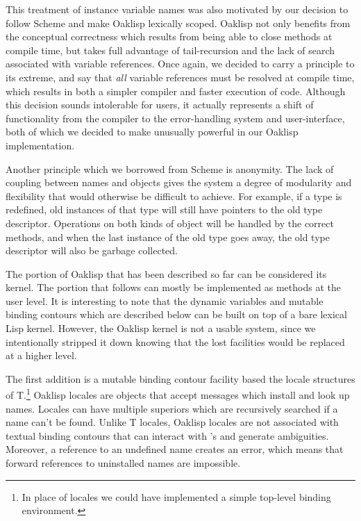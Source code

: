 This treatment of instance variable names was also motivated by our
decision to follow Scheme and make Oaklisp lexically scoped.  Oaklisp
not only benefits from the conceptual correctness which results from
being able to close methods at compile time, but takes full advantage
of tail-recursion and the lack of search associated with variable
references.  Once again, we decided to carry a principle to its
extreme, and say that \emph{all} variable references must be resolved
at compile time, which results in both a simpler compiler and faster
execution of code.  Although this decision sounds intolerable for
users, it actually represents a shift of functionality from the
compiler to the error-handling system and user-interface, both of
which we decided to make unusually powerful in our Oaklisp
implementation.

Another principle which we borrowed from Scheme is anonymity.  The
lack of coupling between names and objects gives the system a degree
of modularity and flexibility that would otherwise be difficult to
achieve.  For example, if a type is redefined, old instances of that
type will still have pointers to the old type descriptor.  Operations
on both kinds of object will be handled by the correct methods, and
when the last instance of the old type goes away, the old type
descriptor will also be garbage collected.

The portion of Oaklisp that has been described so far can be
considered its kernel.  The portion that follows can mostly be
implemented as methods at the user level.  It is interesting to note
that the dynamic variables and mutable binding contours which are
described below can be built on top of a bare lexical Lisp kernel.
However, the Oaklisp kernel is not a usable system, since we
intentionally stripped it down knowing that the lost facilities would
be replaced at a higher level.

The first addition is a mutable binding contour facility based the
locale structures of T.\footnote{In place of locales we could have
implemented a simple top-level binding environment.} Oaklisp locales
are objects that accept messages which install and look up names.
Locales can have multiple superiors which are recursively searched if
a name can't be found.  Unlike T locales, Oaklisp locales are not
associated with textual binding contours that can interact with
's and generate ambiguities.  Moreover, a reference to an
undefined name creates an error, which means that forward references
to uninstalled names are impossible.

